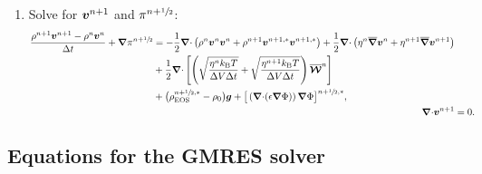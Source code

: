 \documentclass[
10pt
showpacs, showkeys,
amsmath,amssymb,
aps,
pre,
floatfix,
]{revtex4-1}
\newcommand{\divg}{{\V\nabla\cdot}}                       %
\begin{document}
\begin{enumerate}
\item Solve for $\boldsymbol{v}^{n+1}$ and $\pi^{n+\sfrac{1}{2}}$:
\begin{align}
\label{boussinesq_stokes_v_2nd}
\begin{split}
\frac{\rho^{n+1}\V{v}^{n+1}-\rho^n\V{v}^n}{\D{t}} + \grad\pi^{n+\myhalf}
&= -\frac{1}{2}\divg\left(\rho^n\V{v}^n\V{v}^n+\rho^{n+1}\V{v}^{n+1,*}\V{v}^{n+1,*}\right)
+ \frac{1}{2}\divg\left( \eta^n \overline{\grad}\V{v}^n + \eta^{n+1} \overline{\grad}\V{v}^{n+1} \right) \\
&+ \frac{1}{2}\divg\left[\left( \sqrt{\frac{\eta^n k_\mathrm{B}T}{\D{V}\D{t}}} + \sqrt{\frac{\eta^{n+1} k_\mathrm{B}T}{\D{V}\D{t}}} \right) \overline{\V{\mathcal{W}}}^n \right] \\
&+ \big(\rho^{n+\myhalf,*}_\mathrm{EOS}-\rho_0\big)\V{g} 
+ \big[\left(\divg(\epsilon\grad\Phi)\right)\grad\Phi\big]^{n+\myhalf,*}, 
\end{split} \\
\label{boussinesq_stokes_p_2nd}
\divg\V{v}^{n+1} & = 0.
\end{align}

\end{enumerate}

\clearpage

\subsection*{Equations for the GMRES solver}
\end{document}
